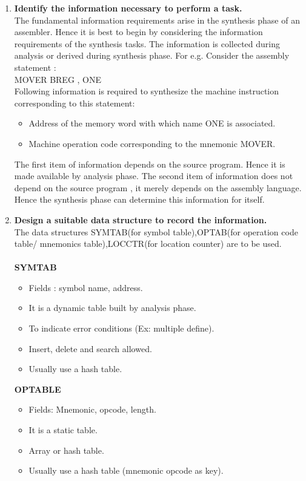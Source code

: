 \documentclass[12pt]{article}
\begin{document}
\begin{enumerate}
\item \textbf{Identify the information necessary to perform a task.}\\The fundamental information requirements arise in the synthesis phase of an
assembler. Hence it is best to begin by considering the information requirements of
the synthesis tasks. The information is collected during analysis or derived during
synthesis phase. For e.g. Consider the assembly statement  :\\MOVER BREG , ONE\\Following information is required to synthesize the machine instruction
corresponding to this statement:\begin{itemize}
  \item Address of the memory word with which name ONE is associated.
  \item Machine operation code corresponding to the mnemonic MOVER.
\end{itemize}The first item of information depends on the source program. Hence it is made
available by analysis phase. The second item of information does not depend on the
source program , it merely depends on the assembly language. Hence the synthesis
phase can determine this information for itself.
\item \textbf{Design a suitable data structure to record the information.}\\ The data structures SYMTAB(for symbol table),OPTAB(for operation code table/ mnemonics table),LOCCTR(for location counter) are to be used.\\\\\textbf{SYMTAB}
 \begin{itemize}\item Fields : symbol name, address.
 \item It is a dynamic table built by analysis phase.
 \item To indicate error conditions (Ex: multiple define).
 \item Insert, delete and search allowed.
 \item Usually use a hash table.  \end{itemize}\textbf{OPTABLE}
 \begin{itemize}\item Fields: Mnemonic, opcode, length.
 \item It is a static table.
 \item Array or hash table.
 \item Usually use a hash table (mnemonic opcode as key).

\end{itemize}
\end{enumerate}
\end{document}

